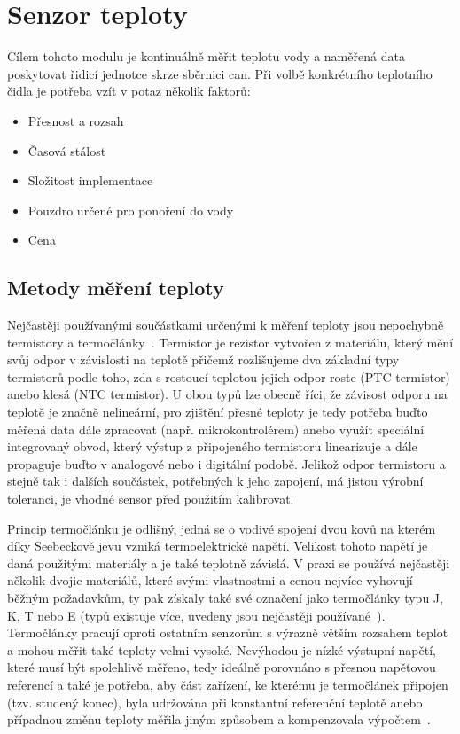 \section{Senzor teploty}
\label{sec:perif-sensor-teploty}
    Cílem tohoto modulu je kontinuálně měřit teplotu vody a naměřená data poskytovat řidicí jednotce skrze sběrnici \acs{can}. Při volbě konkrétního teplotního čidla je potřeba vzít v potaz několik faktorů:
    \begin{itemize}
        \item Přesnost a rozsah
        \item Časová stálost
        \item Složitost implementace 
        \item Pouzdro určené pro ponoření do vody
        \item Cena
    \end{itemize}

    \subsection{Metody měření teploty}
        Nejčastěji používanými součástkami určenými k měření teploty jsou nepochybně termistory a termočlánky~\cite{allaboutcircuits2023tempsensors}. Termistor je rezistor vytvořen z materiálu, který mění svůj odpor v závislosti na teplotě přičemž rozlišujeme dva základní typy termistorů podle toho, zda s rostoucí teplotou jejich odpor roste (PTC termistor) anebo klesá (NTC termistor). U obou typů lze obecně říci, že závisost odporu na teplotě je značně nelineární, pro zjištění přesné teploty je tedy potřeba buďto měřená data dále zpracovat (např. mikrokontrolérem) anebo využít speciální integrovaný obvod, který výstup z připojeného termistoru linearizuje a dále propaguje buďto v analogové nebo i digitální podobě. Jelikož odpor termistoru a stejně tak i dalších součástek, potřebných k jeho zapojení, má jistou výrobní toleranci, je vhodné sensor před použitím kalibrovat.

        Princip termočlánku je odlišný, jedná se o vodivé spojení dvou kovů na kterém díky Seebeckově jevu vzniká termoelektrické napětí. Velikost tohoto napětí je daná použitými materiály a je také teplotně závislá. V praxi se používá nejčastěji několik dvojic materiálů, které svými vlastnostmi a cenou nejvíce vyhovují běžným požadavkům, ty pak získaly také své označení jako termočlánky typu J, K, T nebo E (typů existuje více, uvedeny jsou nejčastěji používané~\cite{TechieScience_Thermocouples}). Termočlánky pracují oproti ostatním senzorům s výrazně větším rozsahem teplot a mohou měřit také teploty velmi vysoké. Nevýhodou je nízké výstupní napětí, které musí být spolehlivě měřeno, tedy ideálně porovnáno s přesnou napěťovou referencí a také je potřeba, aby část zařízení, ke kterému je termočlánek připojen (tzv. studený konec), byla udržována při konstantní referenční teplotě anebo případnou změnu teploty měřila jiným způsobem a kompenzovala výpočtem~\cite{allaboutcircuits2023tempsensors,TechieScience_Thermocouples}.

